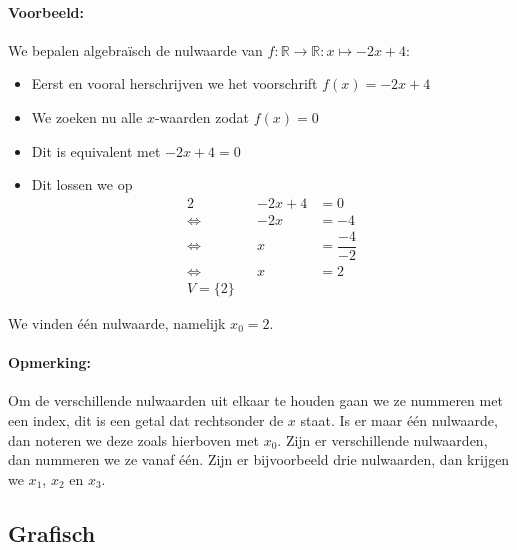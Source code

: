 \documentclass[12pt,twoside]{article}
\newcommand{\lra}{\ensuremath{\Leftrightarrow\qquad}}
\begin{document}
\paragraph{Voorbeeld:} We bepalen algebraïsch de nulwaarde van $f:\mathbb{R}\to\mathbb{R}:x\mapsto-2x+4$:

\begin{itemize}
  \item Eerst en vooral herschrijven we het voorschrift $f(x)=-2x+4$
  \item We zoeken nu alle $x$-waarden zodat $f(x)=0$
  \item Dit is equivalent met $-2x+4=0$
  \item Dit lossen we op
\begin{alignat*}{2}
       && -2x+4 &= 0\\
  \lra &&   -2x &= -4\\
  \lra &&    x &= \dfrac{-4}{-2}\\
  \lra &&    x &= 2\\
  V=\{2\}
\end{alignat*}
\end{itemize}

We vinden één nulwaarde, namelijk $x_0=2$.

\paragraph*{Opmerking:} Om de verschillende nulwaarden uit elkaar te houden gaan we ze nummeren met een index, dit is een getal dat rechtsonder de $x$ staat. Is er maar één nulwaarde, dan noteren we deze zoals hierboven met $x_0$. Zijn er verschillende nulwaarden, dan nummeren we ze vanaf één. Zijn er bijvoorbeeld drie nulwaarden, dan krijgen we $x_1$, $x_2$ en $x_3$.


\subsection{Grafisch}
\end{document}
